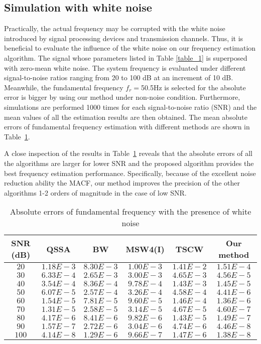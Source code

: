 \documentclass[journal,twoside]{IEEEtran}
\begin{document}
\subsection{Simulation with white noise}
Practically, the actual frequency may be corrupted with the white noise introduced by signal processing devices and transmission channels. Thus, it is beneficial to evaluate the influence of the white noise on our frequency estimation algorithm. The signal whose parameters listed in Table \ref{table_1} is superposed with zero-mean white noise. The system frequency is evaluated under different signal-to-noise ratios ranging from 20 to 100 dB at an increment of 10 dB. Meanwhile, the fundamental frequency $f_r=$50.5Hz is selected for the absolute error is bigger by using our method under non-noise condition. Furthermore, simulations are performed 1000 times for each signal-to-noise ratio (SNR) and the mean values of all the estimation results are then obtained. The mean absolute errors of fundamental frequency estimation with different methods are shown in Table~\ref{table_3}.

A close inspection of the results in Table~\ref{table_3} reveals that the absolute errors of all the algorithms are larger for lower SNR and the proposed algorithm provides the best frequency estimation performance. Specifically, because of the excellent noise reduction ability the MACF, our method improves the precision of the other algorithms 1-2 orders of magnitude in the case of low SNR.
\begin{table}
	\renewcommand{\arraystretch}{1.3}
	\caption{Absolute errors of fundamental frequency with the presence of white noise}
	\label{table_3}
	\centering
	\begin{tabular}{@{ }c@{ }@{ }c@{ }@{ }c@{ }@{ }c@{ }@{ }c@{ }@{ }c@{ }}
		\toprule
		SNR (dB)  & QSSA       & BW        & MSW4(I)    & TSCW       & \textbf{Our method}\\
		\midrule
		$20$      & $1.18E-3$  & $8.30E-3$ & $1.00E-3$  & $1.41E-2$  & $1.51E-4$ \\
		$30$      & $6.33E-4$  & $2.65E-3$ & $3.00E-3$  & $4.65E-3$  & $4.56E-5$ \\
		$40$      & $3.54E-4$  & $8.36E-4$ & $9.78E-4$  & $1.43E-3$  & $1.45E-5$ \\
		$50$      & $6.07E-5$  & $2.57E-4$ & $3.26E-4$  & $4.58E-4$  & $4.41E-6$ \\
		$60$      & $1.54E-5$  & $7.81E-5$ & $9.60E-5$  & $1.46E-4$  & $1.36E-6$ \\
		$70$      & $1.31E-5$  & $2.58E-5$ & $3.14E-5$  & $4.67E-5$  & $4.60E-7$ \\
		$80$      & $4.17E-6$  & $8.41E-6$ & $9.82E-6$  & $1.43E-5$  & $1.49E-7$ \\
		$90$      & $1.57E-7$  & $2.72E-6$ & $3.04E-6$  & $4.74E-6$  & $4.46E-8$ \\
		$100$     & $4.14E-8$  & $1.29E-6$ & $9.66E-7$  & $1.47E-6$  & $1.38E-8$ \\
		\bottomrule
	\end{tabular}
\end{table}
\end{document}

